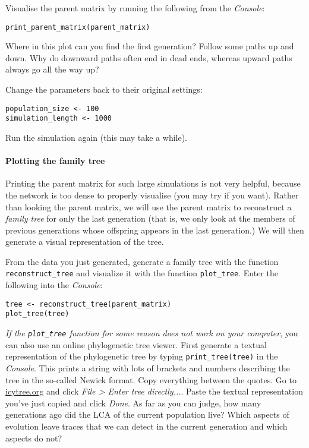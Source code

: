 \documentclass[a4paper, 9pt]{article}
\begin{document}
\begin{exercise}
\action Visualise the parent matrix by running the following from the \emph{Console}:
\begin{lstlisting}
print_parent_matrix(parent_matrix)
\end{lstlisting}
Where in this plot can you find the first generation?
\askstar Follow some paths up and down. Why do downward paths often end in dead ends, whereas upward paths always go all the way up?
\end{exercise}

\begin{exercise}
\action Change the parameters back to their original settings:\begin{lstlisting}
population_size <- 100
simulation_length <- 1000
\end{lstlisting}
\action Run the simulation again (this may take a while).
\end{exercise}

\paragraph{Plotting the family tree} Printing the parent matrix for such large simulations is not very helpful, because the network is too dense to properly visualise (you may try if you want). Rather than looking the parent matrix, we will use the parent matrix to reconstruct a \emph{family tree} for only the last generation (that is, we only look at the members of previous generations whose offspring appears in the last generation.) We will then generate a visual representation of the tree.

\begin{exercise}
\action From the data you just generated, generate a family tree with the function \verb|reconstruct_tree| and visualize it with the function \verb|plot_tree|.
 Enter the following into the \emph{Console}:
\begin{lstlisting}
tree <- reconstruct_tree(parent_matrix)
plot_tree(tree)
\end{lstlisting}
\action \emph{If the \texttt{plot\_tree} function for some reason does not work on your computer}, you can also use an online phylogenetic tree viewer.
First generate a textual representation of the phylogenetic tree by typing \texttt{print\_tree(tree)} in the \emph{Console}. 
This prints a string with lots of brackets and numbers describing the tree in the so-called Newick format. 
Copy everything between the quotes.
Go to \href{https://icytree.org/}{icytree.org} and click \emph{File > Enter tree directly...}. 
Paste the textual representation you've just copied and click \emph{Done}.
\askstar As far as you can judge, how many generations ago did the LCA of the current population live?
\askstar Which aspects of evolution leave traces that we can detect in the current generation and which aspects do not?
\end{exercise}
\end{document}

